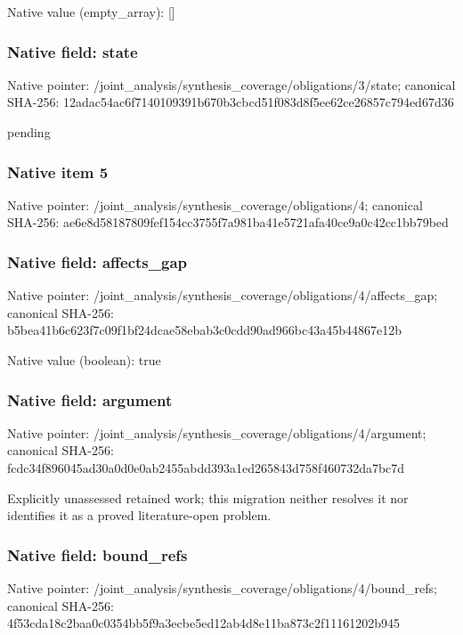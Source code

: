 \documentclass[10pt,a4paper]{article}
\begin{document}
Native value (empty\_\allowbreak{}array): []

\subsubsection{Native field: state}
Native pointer: /joint\_\allowbreak{}analysis/synthesis\_\allowbreak{}coverage/obligations/3/state; canonical SHA-256: 12adac54ac6f7140109391b670b3cbcd51f083d8f5ee62ce26857c794ed67d36

\begingroup\raggedright\sloppy pending\par\endgroup

\subsubsection{Native item 5}
Native pointer: /joint\_\allowbreak{}analysis/synthesis\_\allowbreak{}coverage/obligations/4; canonical SHA-256: ae6e8d58187809fef154cc3755f7a981ba41e5721afa40ce9a0c42cc1bb79bed

\subsubsection{Native field: affects\_\allowbreak{}gap}
Native pointer: /joint\_\allowbreak{}analysis/synthesis\_\allowbreak{}coverage/obligations/4/affects\_\allowbreak{}gap; canonical SHA-256: b5bea41b6c623f7c09f1bf24dcae58ebab3c0cdd90ad966bc43a45b44867e12b

Native value (boolean): true

\subsubsection{Native field: argument}
Native pointer: /joint\_\allowbreak{}analysis/synthesis\_\allowbreak{}coverage/obligations/4/argument; canonical SHA-256: fcdc34f896045ad30a0d0e0ab2455abdd393a1ed265843d758f460732da7bc7d

\begingroup\raggedright\sloppy Explicitly unassessed retained work;\allowbreak{} this migration neither resolves it nor identifies it as a proved literature-open problem.\par\endgroup

\subsubsection{Native field: bound\_\allowbreak{}refs}
Native pointer: /joint\_\allowbreak{}analysis/synthesis\_\allowbreak{}coverage/obligations/4/bound\_\allowbreak{}refs; canonical SHA-256: 4f53cda18c2baa0c0354bb5f9a3ecbe5ed12ab4d8e11ba873c2f11161202b945
\end{document}
